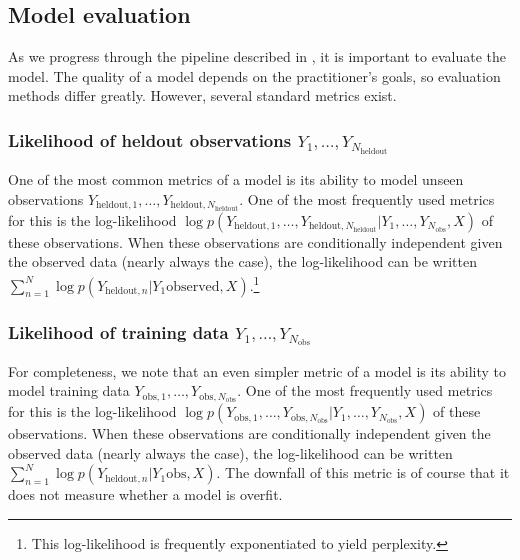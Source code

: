 \subsection{Model evaluation}
As we progress through the pipeline described in , it
is important to evaluate the model.  The quality of a model depends on
the practitioner's goals, so evaluation methods differ greatly.
However, several standard metrics exist.

\subsubsection{Likelihood of heldout observations $Y_1, \ldots, Y_{N_{\mbox{heldout}}}$}
One of the most common metrics of a model is its ability to model
unseen observations $Y_{\mbox{heldout},1}, \ldots,
Y_{\mbox{heldout},N_{\mbox{heldout}}}$.  One of the most frequently
used metrics for this is the log-likelihood $\log
p(Y_{\mbox{heldout},1}, \ldots, Y_{\mbox{heldout},N_{\mbox{heldout}}} |
  Y_1, \ldots, Y_{N_{\mbox{obs}}}, X )$ of these observations. When
  these observations are conditionally independent given the observed
  data (nearly always the case), the log-likelihood can be
  written $\sum_{n=1}^N \log p(Y_{\mbox{heldout},n} | Y_1{\mbox{observed}},
  X)$.\footnote{This log-likelihood is frequently exponentiated to
    yield perplexity.}

\subsubsection{Likelihood of training data $Y_1, \ldots, Y_{N_{\mbox{obs}}}$}
For completeness, we note that an even simpler metric of a model is its ability to model training data
$Y_{\mbox{obs},1}, \ldots, Y_{\mbox{obs},N_{\mbox{obs}}}$.
One of the most frequently used metrics for this is the log-likelihood
$\log p(Y_{\mbox{obs},1}, \ldots,
Y_{\mbox{obs},N_{\mbox{obs}}} | Y_1, \ldots,
Y_{N_{\mbox{obs}}}, X )$ of these observations. When these
observations are conditionally independent given the observed data
(nearly always the case), the log-likelihood can be written
$\sum_{n=1}^N \log p(Y_{\mbox{heldout},n} | Y_1{\mbox{obs}}, X)$.
The downfall of this metric is of course that it does not measure whether a model is overfit.



